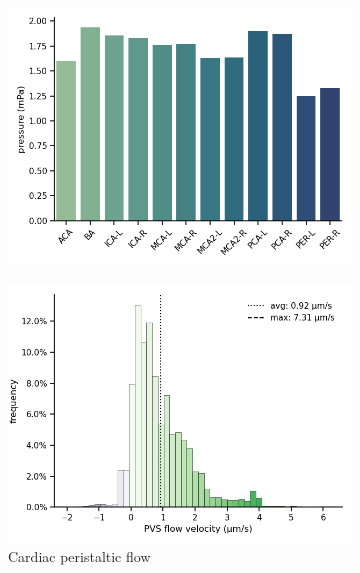 \documentclass[fleqn,10pt]{wlscirep}
\begin{document}
\begin{figure}
\begin{subfigure}[b]{0.33\textwidth}
    \includegraphics[width =  \linewidth]{figures/sas_flow_arteries_labels_pressure.png}
    \end{subfigure}
         \begin{subfigure}[b]{0.33\textwidth}
    \centering
    \includegraphics[width =  \linewidth]{figures/cardiac_pvs_oscillation_velocity_histo_cell.png}
    \caption{Cardiac peristaltic flow}
    \end{subfigure}
    \begin{subfigure}[b]{0.33\textwidth}
    \centering

\end{subfigure}
\end{figure}
\end{document}
